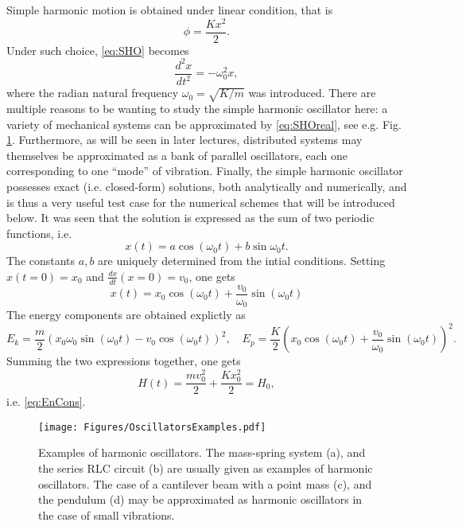 \documentclass[11pt,twoside,a4paper,english]{book}
\begin{document}
Simple harmonic motion is obtained under linear condition, that is
\begin{equation}
    \phi = \frac{Kx^2}{2}.
\end{equation}
Under such choice, \eqref{eq:SHO} becomes
\begin{equation}\label{eq:SHOreal}
    \frac{d^2 x}{dt^2} = - \omega_0^2 x,
\end{equation}
where the radian natural frequency $\omega_0 = \sqrt{K/m}$ was introduced. There are multiple reasons to be wanting to study the simple harmonic oscillator here: a variety of mechanical systems can be approximated by \eqref{eq:SHOreal}, see e.g. Fig. \ref{fig:oscExamples}. Furthermore, as will be seen in later lectures, distributed systems may themselves be approximated as a bank of parallel oscillators, each one corresponding to one ``mode'' of vibration. Finally, the simple harmonic oscillator possesses exact (i.e. closed-form) solutions, both analytically and numerically, and is thus a very useful test case for the numerical schemes that will be introduced below. It was seen that the solution is expressed as the sum of two periodic functions, i.e.
\begin{equation}
    x(t) = a \cos(\omega_0 t) + b \sin{\omega_0 t}.
\end{equation}
The constants $a,b$ are uniquely determined from the intial conditions. Setting $x(t=0)=x_0$ and $\frac{dx}{dt}(x=0)=v_0$, one gets
\begin{equation}\label{eq:SHOexact}
    x(t) = x_0 \cos(\omega_0 t) + \frac{v_0}{\omega_0}\sin(\omega_0 t)
\end{equation}
The energy components are obtained explictly as
\begin{equation}
    E_k = \frac{m}{2}\left(x_0\omega_0\sin(\omega_0 t) - v_0 \cos(\omega_0 t) \right)^2, \quad E_p = \frac{K}{2}\left( x_0 \cos(\omega_0 t) + \frac{v_0}{\omega_0}\sin(\omega_0 t) \right)^2.
\end{equation}
Summing the two expressions together, one gets
\begin{equation}
    H(t) = \frac{m v_0^2}{2} + \frac{K x_0^2}{2} = H_0,
\end{equation}
i.e. \eqref{eq:EnCons}. 
\begin{figure}
    \texttt{[image: Figures/OscillatorsExamples.pdf]}
    \caption{Examples of harmonic oscillators. The mass-spring system (a), and the series RLC circuit (b) are usually given as examples of harmonic oscillators. The case of a cantilever beam with a point mass (c), and the pendulum (d) may  be approximated as harmonic oscillators in the case of small vibrations.}\label{fig:oscExamples}
\end{figure}
\end{document}
